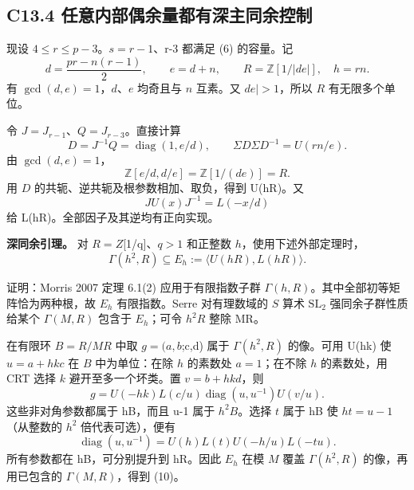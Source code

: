 \documentclass[11pt,a4paper]{article}
\theoremstyle{definition}
\numberwithin{equation}{section}
\begin{document}
\subsection*{\texorpdfstring{{C13.4} {任意内部偶余量都有深主同余控制}}{C13.4 任意内部偶余量都有深主同余控制}}\label{C13-h91}

{现设} {\ensuremath{4\le r\le p-3}。\ensuremath{s=r-1}、r-3} {都满足} {(6)} {的容量。记} \[
d=\frac{pr-n(r-1)}2,\qquad e=d+n,\qquad
R=\mathbb Z[1/|de|],\quad h=rn.
\] {有} {\ensuremath{\operatorname{gcd}(d,e)=1}，\ensuremath{d}、\ensuremath{e}} {均奇且与} {\ensuremath{n}} {互素。又} {\textbar{}\ensuremath{de|>1}，所以} {\ensuremath{R}} {有无限多个单位。}

{令} {\ensuremath{J=J_{r-1}}、\ensuremath{Q=J_{r-3}}。直接计算} \[
D=J^{-1}Q=\operatorname{diag}(1,e/d),\qquad
\Sigma D\Sigma D^{-1}=U(rn/e).
\tag{C13.9}
\] {由} {\ensuremath{\operatorname{gcd}(d,e)=1}，} \[
\mathbb Z[e/d,d/e]=\mathbb Z[1/(de)]=R.
\] {用} {\ensuremath{D}} {的共轭、逆共轭及根参数相加、取负，得到} {U(hR)。又} \[
JU(x)J^{-1}=L(-x/d)
\] {给} {L(hR)。全部因子及其逆均有正向实现。}

\textbf{{深同余引理。}} {对} {\ensuremath{R=Z}{[}1/q{]}、\ensuremath{q>1}} {和正整数} {\ensuremath{h}，使用下述外部定理时，} \[
\boxed{\Gamma(h^2,R)\subseteq
E_h:=\langle U(hR),L(hR)\rangle.}
\tag{C13.10}
\]

{证明：Morris} {2007} {定理} {6.1(2)} {应用于有限指数子群} {\ensuremath{\Gamma (h,R)}。其中全部初等矩阵恰为两种根，故} {\ensuremath{E_{h}}} {有限指数。Serre} {对有理数域的} {\ensuremath{S}} {算术} {\ensuremath{\mathrm{SL}_{2}}} {强同余子群性质给某个} {\ensuremath{\Gamma (M,R)}} {包含于} {\ensuremath{E_{h}}；可令} {\ensuremath{h^{2}R}} {整除} {MR。}

{在有限环} {\ensuremath{B=R/MR}} {中取} {\ensuremath{g=(a,b};c,d)} {属于} {\ensuremath{\Gamma (h^{2},R)}} {的像。可用} {U(hk)} {使} {\ensuremath{u=a+hkc}} {在} {\ensuremath{B}} {中为单位：在除} {\ensuremath{h}} {的素数处} {\ensuremath{a=1}；在不除} {\ensuremath{h}} {的素数处，用} {CRT} {选择} {\ensuremath{k}} {避开至多一个坏类。置} {\ensuremath{v=b+hkd}，则} \[
g=U(-hk)L(c/u)\operatorname{diag}(u,u^{-1})U(v/u).
\] {这些非对角参数都属于} {hB，而且} {u-1} {属于} {\ensuremath{h^{2}B}。选择} {\ensuremath{t}} {属于} {hB} {使} {\ensuremath{ht=u-1}（从整数的} {\ensuremath{h^{2}}} {倍代表可选），便有} \[
\operatorname{diag}(u,u^{-1})
=U(h)L(t)U(-h/u)L(-tu).
\tag{C13.11}
\] {所有参数都在} {hB，可分别提升到} {hR。因此} {\ensuremath{E_{h}}} {在模} {\ensuremath{M}} {覆盖} {\ensuremath{\Gamma (h^{2},R)}} {的像，再用已包含的} {\ensuremath{\Gamma (M,R)}，得到} {(10)。}
\end{document}
